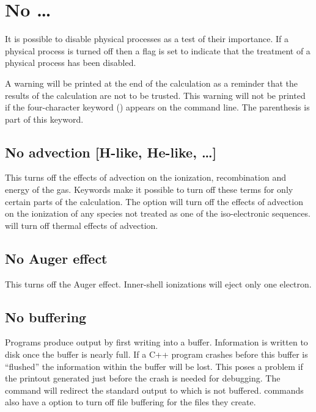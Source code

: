 \section{No \dots}

It is possible to disable physical processes as a test of their
importance.
If a physical process is turned off then a flag is set to
indicate that the treatment of a physical process has been disabled.

A warning will be printed at the end of the calculation as a reminder
that the results of the calculation are not to be trusted.
This warning
will not be printed if the four-character keyword () appears on the command
line.
The parenthesis is part of this keyword.

\subsection{No advection [H-like, He-like, \dots]}

This turns off the effects of advection on the ionization, recombination
and energy of the gas.
Keywords make it possible to turn off these terms
for only certain parts of the calculation.
The  option will turn
off the effects of advection on the ionization of any species not treated
as one of the iso-electronic sequences.
 will turn off thermal effects of advection.

\subsection{No Auger effect}

This turns off the Auger effect.
Inner-shell ionizations will eject only one electron.

\subsection{No buffering}

Programs produce output by first writing into a buffer.
Information is written to disk once the buffer is nearly full.
If a C++ program crashes
before this buffer is ``flushed'' the information within the buffer will
be lost.
This poses a problem if the printout generated just before the
crash is needed for debugging.
The  command will redirect the
standard output to  which is not buffered.   commands also have
a  option to turn off file buffering
for the files they create.

